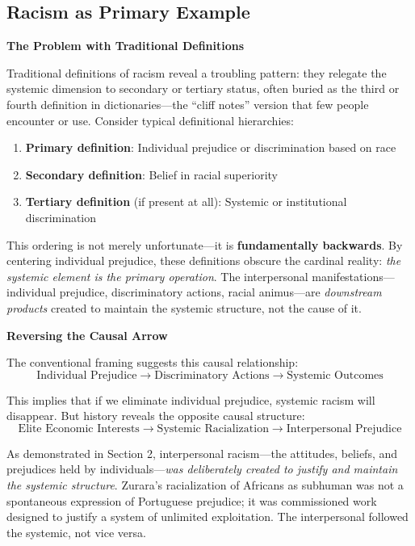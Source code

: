 \documentclass[12pt]{article}
\begin{document}
\subsection{Racism as Primary Example}

\textbf{The Problem with Traditional Definitions}

Traditional definitions of racism reveal a troubling pattern: they relegate the systemic dimension to secondary or tertiary status, often buried as the third or fourth definition in dictionaries---the ``cliff notes'' version that few people encounter or use. Consider typical definitional hierarchies:

\begin{enumerate}
    \item \textbf{Primary definition}: Individual prejudice or discrimination based on race
    \item \textbf{Secondary definition}: Belief in racial superiority
    \item \textbf{Tertiary definition} (if present at all): Systemic or institutional discrimination
\end{enumerate}

This ordering is not merely unfortunate---it is \textbf{fundamentally backwards}. By centering individual prejudice, these definitions obscure the cardinal reality: \textit{the systemic element is the primary operation}. The interpersonal manifestations---individual prejudice, discriminatory actions, racial animus---are \textit{downstream products} created to maintain the systemic structure, not the cause of it.

\textbf{Reversing the Causal Arrow}

The conventional framing suggests this causal relationship:
\[
\text{Individual Prejudice} \rightarrow \text{Discriminatory Actions} \rightarrow \text{Systemic Outcomes}
\]

This implies that if we eliminate individual prejudice, systemic racism will disappear. But history reveals the opposite causal structure:
\[
\text{Elite Economic Interests} \rightarrow \text{Systemic Racialization} \rightarrow \text{Interpersonal Prejudice}
\]

As demonstrated in Section 2, interpersonal racism---the attitudes, beliefs, and prejudices held by individuals---\textit{was deliberately created to justify and maintain the systemic structure}. Zurara's racialization of Africans as subhuman was not a spontaneous expression of Portuguese prejudice; it was commissioned work designed to justify a system of unlimited exploitation. The interpersonal followed the systemic, not vice versa.
\end{document}
